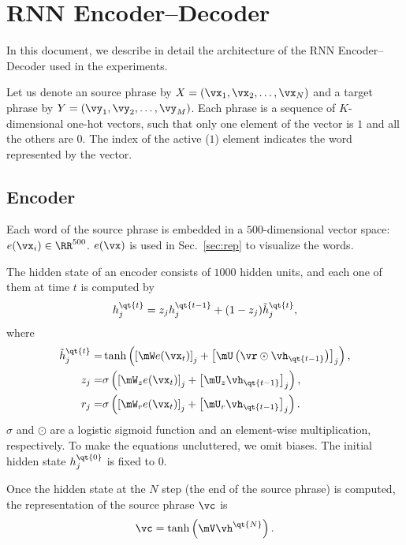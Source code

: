 \section{RNN Encoder--Decoder}
\label{sec:detail}

In this document, we describe in detail the architecture of the RNN
Encoder--Decoder used in the experiments.

Let us denote an source phrase by $X=\left( \vx_1, \vx_2, \dots, \vx_N \right)$
and a target phrase by $Y=\left( \vy_1, \vy_2, \dots, \vy_M \right)$. Each
phrase is a sequence of $K$-dimensional one-hot vectors, such that only one
element of the vector is $1$ and all the others are $0$. The index of the active
($1$) element indicates the word represented by the vector.

\subsection{Encoder}

Each word of the source phrase is embedded in a $500$-dimensional vector space:
$e(\vx_i) \in \RR^{500}$. $e(\vx)$ is used in Sec.~\ref{sec:rep} to visualize
the words.

The hidden state of an encoder consists of $1000$ hidden units,
and each one of them at time $t$ is computed by
\begin{align*}
    h_j^{\qt{t}} = z_j h_j^{\qt{t-1}} + (1 - z_j) \tilde{h}_j^{\qt{t}},
\end{align*}
where
\begin{align*}
    \tilde{h}_j^{\qt{t}} =& \tanh\left( \left[ \mW e(\vx_t) \right]_j + \left[
    \mU \left( \vr \odot \vh_{\qt{t-1}}\right) \right]_j \right),
    \\
    z_j =& \sigma\left( \left[ \mW_z e(\vx_t) \right]_j + 
    \left[\mU_z \vh_{\qt{t-1}}\right]_j \right),
    \\
    r_j =& \sigma\left( \left[ \mW_r e(\vx_t) \right]_j + 
    \left[\mU_r \vh_{\qt{t-1}}\right]_j \right).
\end{align*}
$\sigma$ and $\odot$ are a logistic sigmoid function and an element-wise
multiplication, respectively. To make the equations uncluttered, we omit
biases. The initial hidden state $h_j^{\qt{0}}$ is fixed to $0$.

Once the hidden state at the $N$ step (the end of the source
phrase) is computed, the representation of the source phrase
$\vc$ is
\begin{align*}
    \vc = \tanh \left( \mV \vh^{\qt{N}} \right).
\end{align*}

